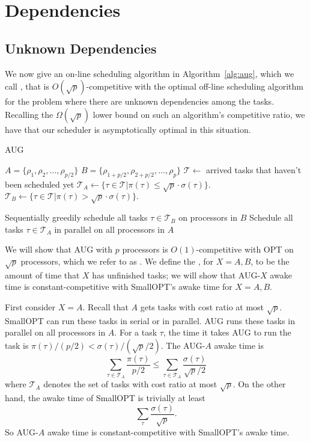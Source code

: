 \section{Dependencies}
\label{sec:dependencies}

\subsection{Unknown Dependencies}
We now give an on-line scheduling algorithm in
Algorithm~\ref{alg:aug}, which we call , that is
$O(\sqrt{p})$-competitive with the optimal off-line scheduling
algorithm for the problem where there are unknown dependencies
among the tasks.
Recalling the $\Omega(\sqrt{p})$ lower bound on such an
algorithm's competitive ratio, we have that our scheduler is
asymptotically optimal in this situation.

\begin{algorithm}
  \caption{AUG}
  \label{alg:aug}
  \begin{algorithmic}
    \State $A = \{\rho_1, \rho_2, \ldots, \rho_{p/2} \}$
    \State $B = \{\rho_{1+p/2}, \rho_{2+p/2}, \ldots, \rho_{p} \}$
    \State
    \State $\mathcal{T} \gets$ arrived tasks that haven't been scheduled yet
    \State $\mathcal{T}_A \gets \{ \tau \in \mathcal{T} | \pi(\tau) \le \sqrt{p} \cdot \sigma(\tau) \}.$
    \State $\mathcal{T}_B \gets \{ \tau\in \mathcal{T}  | \pi(\tau) > \sqrt{p} \cdot \sigma(\tau) \}.$
    \State
    
      \State Sequentially greedily schedule all tasks $\tau \in \mathcal{T}_B$ on processors in $B$
    \EndIf
    \State Schedule all tasks $\tau \in \mathcal{T}_A$ in parallel on all processors in $A$

  \end{algorithmic}
\end{algorithm}

We will show that AUG with $p$ processors is $O(1)$-competitive
with OPT on $\sqrt{p}$ processors, which we refer to as
. We define the , for $X=A,B$, to be the amount of time that $X$ has
unfinished tasks; we will show that AUG-$X$ awake time is
constant-competitive with SmallOPT's awake time for $X=A,B$.

First consider $X=A$. Recall that $A$ gets tasks with cost ratio
at most $\sqrt{p}$. SmallOPT can run these tasks in serial or in
parallel. AUG runs these tasks in parallel on all processors in
$A$. For a task $\tau$, the time it takes AUG to run the task is
$\pi(\tau)/(p/2) < \sigma(\tau)/ (\sqrt{p}/2)$. The AUG-$A$ awake
time is 
$$\sum_{\tau \in \mathcal{T}_A} \frac{\pi(\tau)}{p/2} \le \sum_{\tau \in \mathcal{T}_A} \frac{\sigma(\tau)}{\sqrt{p}/2}$$
where $\mathcal{T}_A$ denotes the set of tasks with cost ratio at most $\sqrt{p}$.
On the other hand, the awake time of SmallOPT is trivially at least 
$$\sum_{\tau} \frac{\sigma(\tau)}{\sqrt{p}}.$$
So AUG-$A$ awake time is constant-competitive with SmallOPT's awake time.

